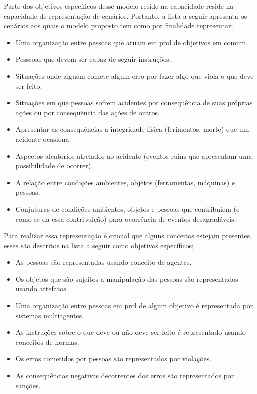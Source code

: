 Parte dos objetivos específicos desse modelo reside na capacidade reside na capacidade de representação de cenários. Portanto, a lista a seguir apresenta os cenários aos quais o modelo proposto tem como por finalidade representar;
\begin{itemize}
    \item Uma organização entre pessoas que atuam em prol de objetivos em comum.
    \item Pesssoas que devem ser capaz de seguir instruções. 
    \item Situações onde alguém comete algum erro por fazer algo que viola o que deve ser feito. 
    \item Situações em que pessoas sofrem acidentes por consequência de suas próprias ações ou por consequência das ações de outros. 
    \item Apresentar as consequências a integridade física (ferimentos, morte) que um acidente ocasiona. 
    \item Aspectos aleatórios atrelados ao acidente (eventos ruins que apresentam uma possibilidade de ocorrer). 
    \item A relação entre condições ambientes, objetos (ferramentas, máquinas) e pessoas. 
    \item Conjuturas de condições ambientes, objetos e pessoas que contribuiem (e como se dá essa contribuição) para ocorrência de eventos desagradáveis. 
\end{itemize} 

Para realizar essa representação é crucial que alguns conceitos estejam presentes, esses são descritos na lista a seguir como objetivos específicos;

\begin{itemize}
	\item As pessoas são representadas usando conceito de agentes.
	\item Os objetos que são sujeitos a manipulação das pessoas são representados usando artefatos.
	\item Uma organização entre pessoas em prol de algum objetivo é representada por sistemas multiagentes. 
	\item As instruções sobre o que deve ou não deve ser feito é representado usando conceitos de normas.	
	\item Os erros cometidos por pessoas são representados por violações. 
	\item As consequências negativas decorrentes dos erros são representados por sanções.	
\end{itemize}

